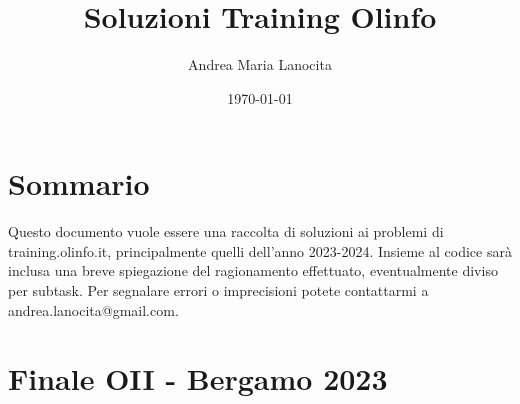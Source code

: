 \documentclass[10pt, a4paper, oneside]{report} %
\author{Andrea Maria Lanocita}
\date{\today}
\title{Soluzioni Training Olinfo}
\theoremstyle{plain}
\theoremstyle{definition}
\begin{document}
    \maketitle

    \chapter*{Sommario}
	Questo documento vuole essere una raccolta di soluzioni ai problemi di training.olinfo.it, principalmente quelli dell'anno 2023-2024.
    Insieme al codice sarà inclusa una breve spiegazione del ragionamento effettuato, eventualmente diviso per subtask.
    Per segnalare errori o imprecisioni potete contattarmi a andrea.lanocita@gmail.com.
	
	\tableofcontents
    \clearpage

    \chapter{Finale OII - Bergamo 2023}
    
\end{document}
